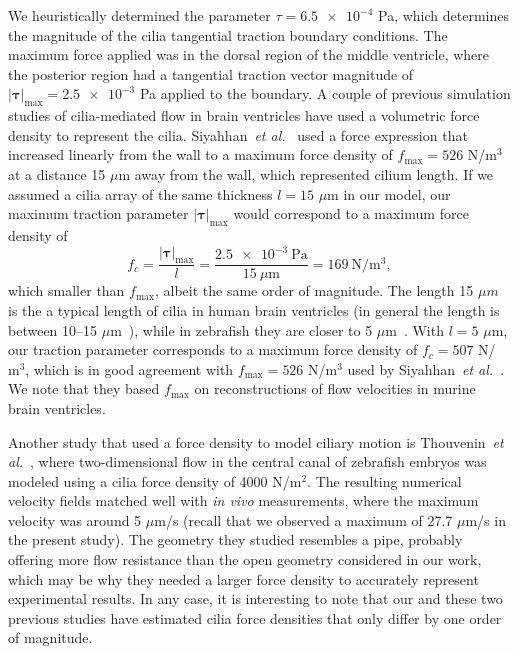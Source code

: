 \documentclass[fleqn]{wlscirep}
\newcommand{\btau}{\bm{\tau}}
\begin{document}
We heuristically determined the parameter $\tau = \num{6.5e-4}$ Pa, which determines the magnitude of the cilia tangential traction boundary conditions. The maximum force applied was in the dorsal region of the middle ventricle, where the posterior region had a tangential traction vector magnitude of $\vert\btau\vert_{\mathrm{max}} = \num{2.5e-3}$ Pa applied to the boundary. A couple of previous simulation studies of cilia-mediated flow in brain ventricles have used a volumetric force density to represent the cilia. Siyahhan~\emph{et al.}~\cite{Siyahhan2014FlowVentricles} used a force expression that increased linearly from the wall to a maximum force density of $f_{\mathrm{max}} = 526$ N/$\mathrm{m^3}$ at a distance 15 $\mu$m away from the wall, which represented cilium length. If we assumed a cilia array of the same thickness $l = 15$ $\mu$m in our model, our maximum traction parameter $\vert\btau\vert_{\mathrm{max}}$ would correspond to a maximum force density of 
\begin{equation*}
    f_c = \frac{\vert\btau\vert_{\mathrm{max}}}{l} = \frac{\num{2.5e-3} \ \mathrm{Pa}}{15 \ \mu\mathrm{m}} = 169 \ \mathrm{N/m^3},
\end{equation*}
which smaller than $f_{\mathrm{max}}$, albeit the same order of magnitude. The length 15 $\mu m$ is the a typical length of cilia in human brain ventricles (in general the length is between 10--15 $\mu$m~\cite{Afzelius2004Cilia-relatedDiseases}), while in zebrafish they are closer to 5 $\mu$m~\cite{Salman2022ComputationalEmbryo}. With $l=5$ $\mu$m, our traction parameter corresponds to a maximum force density of $f_c=507$ N/$\mathrm{m^3}$, which is in good agreement with $f_{\mathrm{max}} = 526$ N/$\mathrm{m^3}$ used by Siyahhan~\emph{et al.}~\cite{Siyahhan2014FlowVentricles}. We note that they based $f_{\mathrm{max}}$ on reconstructions of flow velocities in murine brain ventricles.

Another study that used a force density to model ciliary motion is Thouvenin~\emph{et al.}~\cite{Thouvenin2020OriginCanal}, where two-dimensional flow in the central canal of zebrafish embryos was modeled using a cilia force density of 4000 N/$\mathrm{m^2}$. The resulting numerical velocity fields matched well with \emph{in vivo} measurements, where the maximum velocity was around 5 $\mu$m/s (recall that we observed a maximum of 27.7 $\mu$m/s in the present study). The geometry they studied resembles a pipe, probably offering more flow resistance than the open geometry considered in our work, which may be why they needed a larger force density to accurately represent experimental results. In any case, it is interesting to note that our and these two previous studies have estimated cilia force densities that only differ by one order of magnitude.
\end{document}
